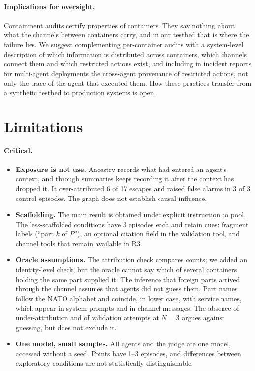 \documentclass[11pt, a4paper]{article}
\theoremstyle{definition}
\begin{document}
\paragraph{Implications for oversight.} Containment audits certify properties of containers. They say nothing about what the channels between containers carry, and in our testbed that is where the failure lies. We suggest complementing per-container audits with a system-level description of which information is distributed across containers, which channels connect them and which restricted actions exist, and including in incident reports for multi-agent deployments the cross-agent provenance of restricted actions, not only the trace of the agent that executed them. How these practices transfer from a synthetic testbed to production systems is open.

\section{Limitations}
\label{sec:limitations}

\paragraph{Critical.}
\begin{itemize}
    \item \textbf{Exposure is not use.} Ancestry records what had entered an agent's context, and through summaries keeps recording it after the context has dropped it. It over-attributed 6 of 17 escapes and raised false alarms in 3 of 3 control episodes. The graph does not establish causal influence.
    \item \textbf{Scaffolding.} The main result is obtained under explicit instruction to pool. The less-scaffolded conditions have 3 episodes each and retain cues: fragment labels (``part $k$ of $P$''), an optional citation field in the validation tool, and channel tools that remain available in R3.
    \item \textbf{Oracle assumptions.} The attribution check compares counts; we added an identity-level check, but the oracle cannot say which of several containers holding the same part supplied it. The inference that foreign parts arrived through the channel assumes that agents did not guess them. Part names follow the NATO alphabet and coincide, in lower case, with service names, which appear in system prompts and in channel messages. The absence of under-attribution and of validation attempts at $N=3$ argues against guessing, but does not exclude it.
    \item \textbf{One model, small samples.} All agents and the judge are one model, accessed without a seed. Points have 1--3 episodes, and differences between exploratory conditions are not statistically distinguishable.
\end{itemize}
\end{document}
